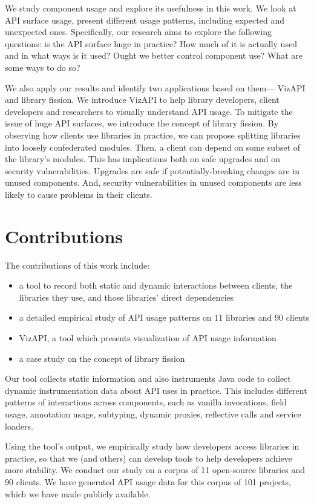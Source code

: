 We study component usage and explore its usefulness in this work. We look at API surface usage, present different usage patterns, including expected and unexpected ones. Specifically, our research aims to explore the following questions: is the API surface huge in practice? How much of it is actually used and in what ways is it used? Ought we better control component use? What are some ways to do so? 

We also apply our results and identify two applications based on them--- VizAPI and library fission. We introduce VizAPI to help library developers, client developers and researchers to visually understand API usage. To mitigate the issue of huge API surfaces, we introduce the concept of library fission. By observing how clients use libraries in practice, we can propose splitting libraries into loosely confederated modules. Then, a client can depend on some subset of the library’s modules. This has implications both on safe upgrades and on security vulnerabilities. Upgrades are
 safe if potentially-breaking changes are in unused components. And, security vulnerabilities in unused components are less likely to cause problems in their clients.

\section{Contributions}
\label{sec:contributions}

The contributions of this work include:
\begin{itemize}
\item a tool to record both static and dynamic interactions between clients, the libraries they use, and those libraries’ direct dependencies
\item a detailed empirical study of API usage patterns on 11 libraries and 90 clients 
\item VizAPI, a tool which presents visualization of API usage information
\item a case study on the concept of library fission
\end{itemize}

Our tool collects static information and also instruments Java code to collect dynamic instrumentation data about API uses in practice. This includes different patterns of interactions across components, such as vanilla invocations, field usage, annotation usage, subtyping, dynamic proxies, reflective calls and service loaders. 

Using the tool's output, we empirically study how developers access libraries in practice, so that we (and others) can develop tools to help developers achieve more stability. We conduct our study on a corpus of 11 open-source libraries and 90 clients. We have generated API usage data for this corpus of 101 projects, which we have made publicly available. 

